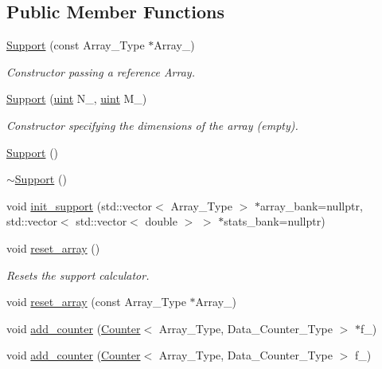\subsection*{Public Member Functions}
\begin{DoxyCompactItemize}
\item 
\hyperlink{classbarry_1_1_support_ab34144acc225be907c1403b06573b016}{Support} (const Array\+\_\+\+Type $\ast$Array\+\_\+)
\begin{DoxyCompactList}\small\item\em Constructor passing a reference Array. \end{DoxyCompactList}\item 
\hyperlink{classbarry_1_1_support_a0deea9b8e83fd418dfad59fb4cfb2ad5}{Support} (\hyperlink{namespacebarry_a11dfc53ddb4672278319aa04f1e09a6c}{uint} N\+\_\+, \hyperlink{namespacebarry_a11dfc53ddb4672278319aa04f1e09a6c}{uint} M\+\_\+)
\begin{DoxyCompactList}\small\item\em Constructor specifying the dimensions of the array (empty). \end{DoxyCompactList}\item 
\hyperlink{classbarry_1_1_support_a08a48546e91c5259a26be4cde31ef902}{Support} ()
\item 
\hyperlink{classbarry_1_1_support_a4ea99cc1691b04b76a333e851aab4b64}{$\sim$\+Support} ()
\item 
void \hyperlink{classbarry_1_1_support_a013872a55ffd6a0a931e124da8e8dc99}{init\+\_\+support} (std\+::vector$<$ Array\+\_\+\+Type $>$ $\ast$array\+\_\+bank=nullptr, std\+::vector$<$ std\+::vector$<$ double $>$ $>$ $\ast$stats\+\_\+bank=nullptr)
\item 
void \hyperlink{classbarry_1_1_support_a4f2860fd2e8e30703b91633a92ed7a58}{reset\+\_\+array} ()
\begin{DoxyCompactList}\small\item\em Resets the support calculator. \end{DoxyCompactList}\item 
void \hyperlink{classbarry_1_1_support_a6e39b22dfd1e0a0ceebf596c974f5326}{reset\+\_\+array} (const Array\+\_\+\+Type $\ast$Array\+\_\+)
\item 
void \hyperlink{classbarry_1_1_support_a364df2c6295341f2801ebe0419d1d97c}{add\+\_\+counter} (\hyperlink{classbarry_1_1_counter}{Counter}$<$ Array\+\_\+\+Type, Data\+\_\+\+Counter\+\_\+\+Type $>$ $\ast$f\+\_\+)
\item 
void \hyperlink{classbarry_1_1_support_a00d511970c0bf833ef8bdd7580c670cc}{add\+\_\+counter} (\hyperlink{classbarry_1_1_counter}{Counter}$<$ Array\+\_\+\+Type, Data\+\_\+\+Counter\+\_\+\+Type $>$ f\+\_\+)

\end{DoxyCompactItemize}
